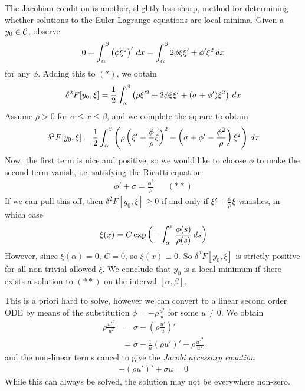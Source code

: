 \documentclass{../template/note}
\begin{document}
    The Jacobian condition is another, slightly less sharp, method for determining whether solutions to the Euler-Lagrange equations are local minima. Given a $y_0 \in \mathcal{C}$, observe
    \begin{align*}
        0 = \int_\alpha^\beta \left(\phi \xi^2\right)' \,d{x} = \int_\alpha^\beta 2\phi \xi \xi' + \phi' \xi^2 \,d{x}
    \end{align*}
    for any $\phi$. Adding this to $(*)$, we obtain
    \begin{align*}
        \delta^2 F[y_0, \xi] = \frac 1 2 \int_\alpha^\beta \left(\rho \xi'^2 + 2\phi \xi \xi' + (\sigma+\phi')\xi^2\right) \,d{x}
    \end{align*}
    Assume $\rho > 0$ for $\alpha \leq x \leq \beta$, and we complete the square to obtain
    \begin{align*}
        \delta^2 F[y_0, \xi] = \frac 1 2 \int_\alpha^\beta \left(\rho \left(\xi' + \frac \phi \rho \xi\right)^2 + \left(\sigma + \phi' - \frac{\phi^2}{\rho}\right)\xi^2 \right) \,d{x}
    \end{align*}
    Now, the first term is nice and positive, so we would like to choose $\phi$ to make the second term vanish, i.e. satisfying the Ricatti equation
    \begin{align*}
        \phi' + \sigma = \frac{\phi^2}{\rho} && (**)
    \end{align*}
    If we can pull this off, then $\delta^2 F[y_0, \xi] \geq 0$ if and only if $\xi' + \frac \phi \rho \xi$ vanishes, in which case
    \begin{align*}
        \xi(x) = C \exp\left(-\int_\alpha^x \frac{\phi(s)}{\rho(s)} \,d{s}\right)
    \end{align*}
    However, since $\xi(\alpha) = 0$, $C=0$, so $\xi(x) \equiv 0$. So $\delta^2F[y_0, \xi]$ is strictly positive for all non-trivial allowed $\xi$. We conclude that $y_0$ is a local minimum if there exists a solution to $(**)$ on the interval $[\alpha, \beta]$.  
    
    This is a priori hard to solve, however we can convert to a linear second order ODE by means of the substitution $\phi = -\rho \frac{u'}{u}$ for some $u \neq 0$. We obtain
    \begin{align*}
        \rho \frac {u'^2} {u^2} &= \sigma - \left(\rho \frac{u'} u\right)' \\
        &= \sigma - \frac 1 u (\rho u')' + \rho \frac{u'^2}{u^2}
    \end{align*}
    and the non-linear terms cancel to give the \emph{Jacobi accessory equation}
    \begin{align*}
        -(\rho u')' + \sigma u = 0
    \end{align*}
    While this can always be solved, the solution may not be everywhere non-zero.
\end{document}
